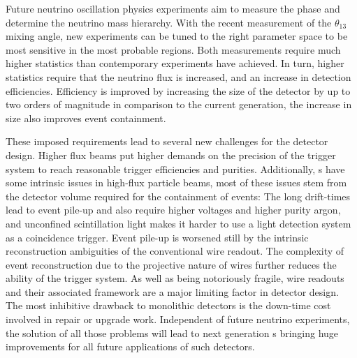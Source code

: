 Future neutrino oscillation physics experiments aim to measure the \dcp phase and determine the neutrino mass hierarchy.
With the recent measurement of the $\theta_{13}$ mixing angle, new experiments can be tuned to the right parameter space to be most sensitive in the most probable regions.
Both measurements require much higher statistics than contemporary experiments have achieved.
In turn, higher statistics require that the neutrino flux is increased, and an increase in detection efficiencies.
Efficiency is improved by increasing the size of the detector by up to two orders of magnitude in comparison to the current generation, the increase in size also improves event containment.

These imposed requirements lead to several new challenges for the detector design.
Higher flux beams put higher demands on the precision of the trigger system to reach reasonable trigger efficiencies and purities.
Additionally, \lartpc{}s have some intrinsic issues in high-flux particle beams, most of these issues stem from the detector volume required for the containment of events:
The long drift-times lead to event pile-up and also require higher voltages and higher purity argon, and unconfined scintillation light makes it harder to use a light detection system as a coincidence trigger.
Event pile-up is worsened still by the intrinsic reconstruction ambiguities of the conventional wire readout.
The complexity of event reconstruction due to the projective nature of wires further reduces the ability of the trigger system.
As well as being notoriously fragile, wire readouts and their associated framework are a major limiting factor in detector design.
The most inhibitive drawback to monolithic detectors is the down-time cost involved in repair or upgrade work.
Independent of future neutrino experiments, the solution of all those problems will lead to next generation \lartpc{}s bringing huge improvements for all future applications of such detectors.